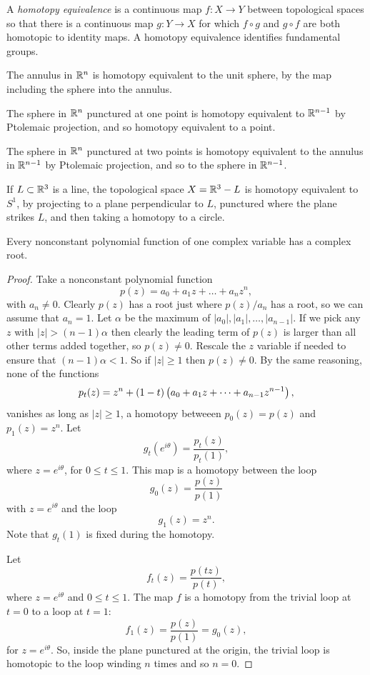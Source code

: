 A \emph{homotopy equivalence} is a continuous map \(f \colon X \to Y\) between topological spaces so that there is a continuous map \(g \colon Y \to X\) for which \(f \circ g\) and \(g \circ f\) are both homotopic to identity maps.
A homotopy equivalence identifies fundamental groups.
\begin{example}
The annulus in \(\mathbb{R}^{n}\) is homotopy equivalent to the unit sphere, by the map including the sphere into the annulus.
\end{example}
\begin{example}
The sphere in \(\mathbb{R}^{n}\) punctured at one point is homotopy equivalent to \(\mathbb{R}^{n-1}\) by Ptolemaic projection, and so homotopy equivalent to a point.
\end{example}
\begin{example}
The sphere in \(\mathbb{R}^{n}\) punctured at two points is homotopy equivalent to the annulus in \(\mathbb{R}^{n-1}\) by Ptolemaic projection, and so to the sphere in \(\mathbb{R}^{n-1}\).
\end{example}
\begin{example}
If \(L \subset \mathbb{R}^{3}\) is a line, the topological space \(X=\mathbb{R}^{3}-L\) is homotopy equivalent to \(S^1\), by projecting to a plane perpendicular to \(L\), punctured where the plane strikes \(L\), and then taking a homotopy to a circle.
\end{example}
\begin{theorem}
Every nonconstant polynomial function of one complex variable has a complex root.
\end{theorem}
\begin{proof}
Take a nonconstant polynomial function 
\[
p(z)=a_0 + a_1 z + \dots + a_n z^n,
\]
with \(a_n \ne 0\).
Clearly \(p(z)\) has a root just where \(p(z)/a_n\) has a root, so we can assume that \(a_n=1\).
Let \(\alpha\) be the maximum of \(|a_0|, |a_1|, \dots, |a_{n-1}|\).
If we pick any \(z\) with \(|z|>(n-1)\alpha\) then clearly the leading term of \(p(z)\) is larger than all other terms added together, so \(p(z) \ne 0\).
Rescale the \(z\) variable if needed to ensure that \((n-1)\alpha<1\).
So if \(|z| \ge 1\) then \(p(z) \ne 0\).
By the same reasoning, none of the functions
\[
p_t(z) = z^n + (1-t)\left(a_0 + a_1 z + \dots + a_{n-1} z^{n-1}\right),
\]
vanishes as long as \(|z|\ge 1\), a homotopy betweeen \(p_0(z)=p(z)\) and \(p_1(z)=z^n\).
Let
\[
g_t(e^{i\theta})=\frac{p_t(z)}{p_t(1)},
\]
where \(z=e^{i \theta}\), for \(0 \le t \le 1\).
This map is a homotopy between the loop 
\[
g_0(z) = \frac{p(z)}{p(1)}
\]
with \(z=e^{i\theta}\) and the loop 
\[
g_1(z)=z^n.
\]
Note that \(g_t(1)\) is fixed during the homotopy.

Let
\[
f_t(z)=\frac{p(tz)}{p(t)},
\]
where \(z=e^{i \theta}\) and \(0 \le t \le 1\).
The map \(f\) is a homotopy from the trivial loop at \(t=0\) to a loop at \(t=1\):
\[
f_1(z) =\frac{p(z)}{p(1)} = g_0(z),
\]
for \(z=e^{i\theta}\).
So, inside the plane punctured at the origin, the trivial loop is homotopic to the loop winding \(n\) times and so \(n=0\).
\end{proof}
